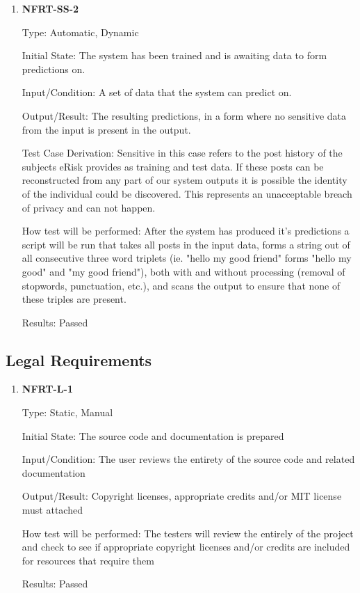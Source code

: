 \documentclass[12pt, titlepage]{article}
\begin{document}
\begin{enumerate}

\item \textbf{NFRT-SS-2}
	
Type: Automatic, Dynamic
						
Initial State: The system has been trained and is awaiting data to form predictions on.
						
Input/Condition: A set of data that the system can predict on.
						
Output/Result: The resulting predictions, in a form where no sensitive data from the input is present in the output.
	
Test Case Derivation: Sensitive in this case refers to the post history of the subjects eRisk provides as training and test data. If these posts can be reconstructed from any part of our system outputs it is possible the identity of the individual could be discovered. This represents an unacceptable breach of privacy and can not happen.
						
How test will be performed: After the system has produced it's predictions a script will be run that takes all posts in the input data, forms a string out of all consecutive three word triplets (ie. "hello my good friend" forms "hello my good" and "my good friend"), both with and without processing (removal of stopwords, punctuation, etc.), and scans the output to ensure that none of these triples are present.

Results: Passed
	
\end{enumerate}

\subsection{Legal Requirements}

\begin{enumerate}

\item \textbf{NFRT-L-1}

Type: Static, Manual
					
Initial State: The source code and documentation is prepared
					
Input/Condition: The user reviews the entirety of the source code and related documentation
					
Output/Result: Copyright licenses, appropriate credits and/or MIT license must attached
					
How test will be performed: The testers will review the entirely of the project and check to see if appropriate copyright licenses and/or credits are included for resources that require them

Results: Passed

\end{enumerate}
\end{document}
